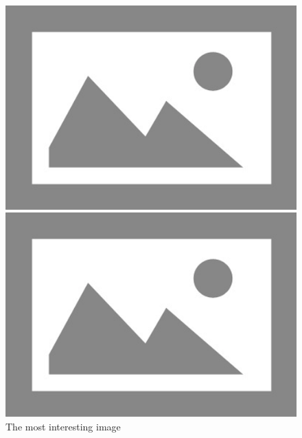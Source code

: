 \documentclass{thesis}
\begin{document}
\begin{figure}
  \caption{The most interesting image}
  \center
  \begin{minipage}[b]{0.49\linewidth}
    \includegraphics[width=\linewidth]{./images/placeholder.png}
  \end{minipage}
  \begin{minipage}[b]{0.49\linewidth}
    \includegraphics[width=\linewidth]{./images/placeholder.png}
  \end{minipage}
\end{figure}
\end{document}
